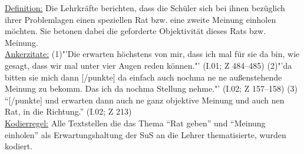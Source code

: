\underline{Definition:} Die Lehrkräfte berichten, dass die Schüler sich bei ihnen bezüglich ihrer Problemlagen einen speziellen Rat bzw. eine zweite Meinung einholen möchten. Sie betonen dabei die geforderte Objektivität dieses Rats bzw. Meinung.\\
\underline{Ankerzitate:} (1)"'Die erwarten höchstens von mir, dass ich mal für sie da bin, wie gesagt, dass wir mal unter vier Augen reden können."' (I.01; Z 484--485) (2)"'da bitten sie mich dann [/punkte] da einfach auch nochma ne ne außenstehende Meinung zu bekomm. Das ich da nochma Stellung nehme."' (I.02; Z 157--158) (3) "`[/punkte] und erwarten dann auch ne ganz objektive Meinung und auch nen Rat, in die Richtung."' (I.02; Z 213)\\
\underline{Kodierregel:} Alle Textstellen die das Thema "`Rat geben"' und "`Meinung einholen"' als Erwartungshaltung der SuS an die Lehrer thematisierte, wurden kodiert. \\


